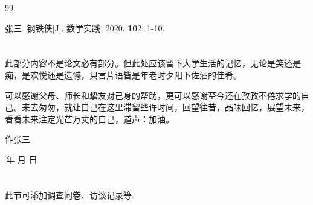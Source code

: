\documentclass[a4paper,12pt,twoside]{ctexart}
\def\authorname{张三} %
\begin{document}
\newpage

\begin{thebibliography}{99}
\setlength{\itemsep}{-0.75ex}
张三. 钢铁侠[J]. 数学实践, 2020, \textbf{10}2: 1-10.
\end{thebibliography}
\newpage
\section*{}\bigskip
{}
    此部分内容不是论文必有部分。但此处应该留下大学生活的记忆，无论是笑还是痴，是欢悦还是遗憾，只言片语皆是年老时夕阳下佐酒的佳肴。

    可以感谢父母、师长和挚友对己身的帮助，更可以感谢至今还在孜孜不倦求学的自己。来去匆匆，就让自己在这里滞留些许时间，回望往昔，品味回忆，展望未来，看看未来注定光芒万丈的自己，道声：加油。\bigskip

    \mbox{}\hfill\ifanonymous 作\else \authorname\fi\qquad\quad\mbox{}\bigskip

    \mbox{}\hfill\number\year\,年\,\number\month\,月\,\number\day\,日\quad

\newpage
\section*{}
\thispagestyle{plain}
此节可添加调查问卷、访谈记录等.
\end{document}
